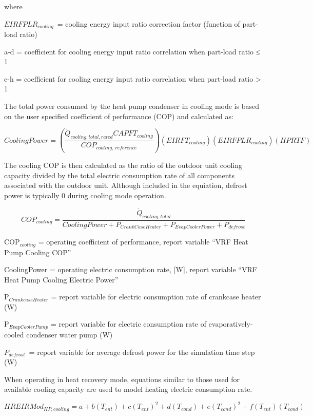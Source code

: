 where

\(EIRFPLR_{cooling}\) = cooling energy input ratio correction factor (function of part-load ratio)

a-d = coefficient for cooling energy input ratio correlation when part-load ratio ≤ 1

e-h = coefficient for cooling energy input ratio correlation when part-load ratio > 1

The total power consumed by the heat pump condenser in cooling mode is based on the user specified coefficient of performance (COP) and calculated as:

\begin{equation}
  CoolingPower = \left( \frac{\dot{Q}_{cooling,total,rated} CAPFT_{cooling}}{COP_{cooling,\,reference}} \right) \left( EIRFT_{cooling} \right) \left( EIRFPLR_{cooling} \right) \left( HPRTF \right)
\end{equation}

The cooling COP is then calculated as the ratio of the outdoor unit cooling capacity divided by the total electric consumption rate of all components associated with the outdoor unit. Although included in the equiation, defrost power is typically 0 during cooling mode operation.

\begin{equation}
  COP_{cooling} = \frac{\dot{Q}_{cooling,total}}{CoolingPower + P_{CrankCaseHeater} + P_{EvapCoolerPower} + P_{defrost}}
\end{equation}

COP\(_{cooling}\) = operating coefficient of performance, report variable ``VRF Heat Pump Cooling COP''

CoolingPower = operating electric consumption rate, [W], report variable ``VRF Heat Pump Cooling Electric Power''

P\(_{CrankcaseHeater}\) = report variable for electric consumption rate of crankcase heater (W)

P\(_{EvapCoolerPump}\) = report variable for electric consumption rate of evaporatively-cooled condenser water pump (W)

\({P_{defrost}}\) = report variable for average defrost power for the simulation time step (W)

When operating in heat recovery mode, equations similar to those used for available cooling capacity are used to model heating electric consumption rate.

\begin{equation}
  HREIRMod_{HP,cooling} = a + b \left( T_{ent} \right) + c \left( T_{ent} \right)^2 + d \left( T_{cond} \right) + e \left( T_{cond} \right)^2 + f \left( T_{ent} \right) \left( T_{cond} \right)
\end{equation}

